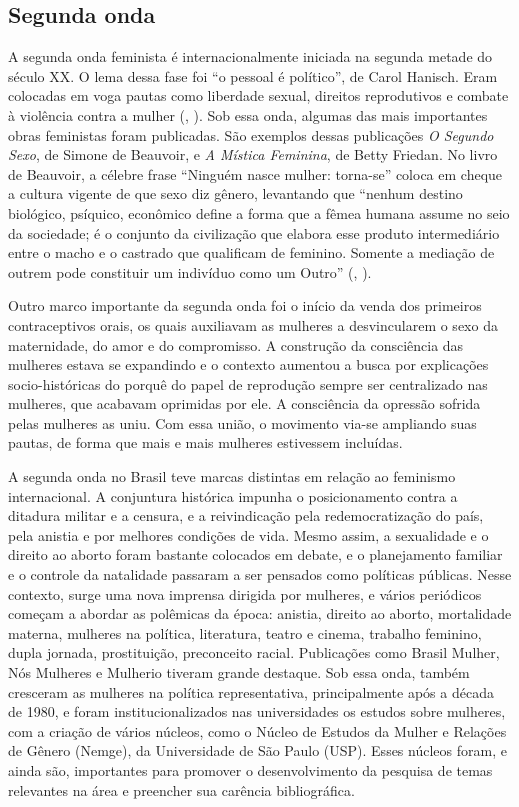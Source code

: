 \documentclass[
	12pt,				%
	openright,			%
	twoside,			%
	a4paper,			%
	english,			%
	brazil				%
	]{abntex2}
\begin{document}
 \subsection{Segunda onda}
 A segunda onda feminista é internacionalmente iniciada na segunda metade do século XX. O lema dessa fase foi “o pessoal é político”, de Carol Hanisch. Eram colocadas em voga pautas como liberdade sexual, direitos reprodutivos e combate à violência contra a mulher (, \citeyear{sousa2018}). Sob essa onda, algumas das mais importantes obras feministas foram publicadas. São exemplos dessas publicações \textit{O Segundo Sexo}, de Simone de Beauvoir, e \textit{A Mística Feminina}, de Betty Friedan. No livro de Beauvoir, a célebre frase ``Ninguém nasce mulher: torna-se'' coloca em cheque a cultura vigente de que sexo diz gênero, levantando que ``nenhum destino biológico, psíquico, econômico define a forma que a fêmea humana assume no seio da sociedade; é o conjunto da civilização que elabora esse produto intermediário entre o macho e o castrado que qualificam de feminino. Somente a mediação de outrem pode constituir um indivíduo como um Outro'' (, \citeyear{beauvoir1967}).

 Outro marco importante da segunda onda foi o início da venda dos primeiros contraceptivos orais, os quais auxiliavam as mulheres a desvincularem o sexo da maternidade, do amor e do compromisso. A construção da consciência das mulheres estava se expandindo e o contexto aumentou a busca por explicações socio-históricas do porquê do papel de reprodução sempre ser centralizado nas mulheres, que acabavam oprimidas por ele. A consciência da opressão sofrida pelas mulheres as uniu. Com essa união, o movimento via-se ampliando suas pautas, de forma que mais e mais mulheres estivessem incluídas.

 A segunda onda no Brasil teve marcas distintas em relação ao feminismo internacional. A conjuntura histórica impunha o posicionamento contra a ditadura militar e a censura, e a reivindicação pela redemocratização do país, pela anistia e por melhores condições de vida. Mesmo assim, a sexualidade e o direito ao aborto foram bastante colocados em debate, e o planejamento familiar e o controle da natalidade passaram a ser pensados como políticas públicas. Nesse contexto, surge uma nova imprensa dirigida por mulheres, e vários periódicos começam a abordar as polêmicas da época: anistia, direito ao aborto, mortalidade materna, mulheres na política, literatura, teatro e cinema, trabalho feminino, dupla jornada, prostituição, preconceito racial. Publicações como Brasil Mulher, Nós Mulheres e Mulherio tiveram grande destaque. Sob essa onda, também cresceram as mulheres na política representativa, principalmente após a década de 1980, e foram institucionalizados nas universidades os estudos sobre mulheres, com a criação de vários núcleos, como o Núcleo de Estudos da Mulher e Relações de Gênero (Nemge), da Universidade de São Paulo (USP). Esses núcleos foram, e ainda são, importantes para promover o desenvolvimento da pesquisa de temas relevantes na área e preencher sua carência bibliográfica.
\end{document}
